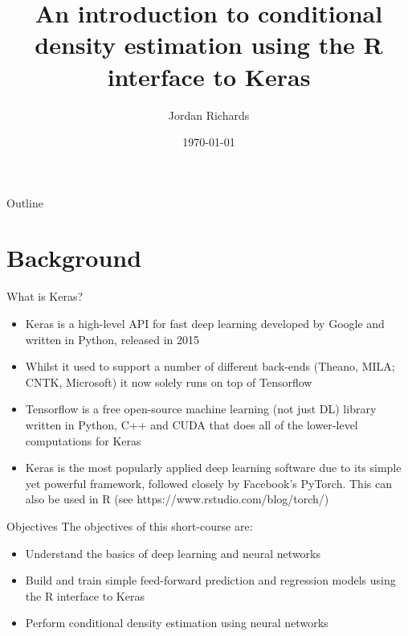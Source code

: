 \documentclass{beamer}
\title[cde-Rkeras-intro]{An introduction to conditional density estimation using the R interface to Keras
}
\author[Jordan Richards]{Jordan Richards}
\institute[KAUST]{King Abdullah University of Science and Technology (KAUST)}
\date{\today}
\begin{document}
\maketitle
\begin{frame}{Outline}
\tableofcontents
\end{frame}
\section{Background}
\begin{frame}{What is Keras?}
\begin{itemize}
\item Keras is a high-level API for fast deep learning developed by Google and written in Python, released in 2015
\item Whilst it used to support a number of different back-ends (Theano, MILA; CNTK, Microsoft) it now solely runs on top of Tensorflow
\item Tensorflow is a free open-source machine learning (not just DL) library written in Python, C++ and CUDA that does all of the lower-level computations for Keras
\item Keras is the most popularly applied deep learning software due to its simple yet powerful framework, followed closely by Facebook's PyTorch. This can also be used in R (see https://www.rstudio.com/blog/torch/)
\end{itemize}

\end{frame}

\begin{frame}{Objectives}
The objectives of this short-course are:
\begin{itemize}
\item Understand the basics of deep learning and neural networks
\item Build and train simple feed-forward prediction and regression models using the R interface to Keras
\item Perform conditional density estimation using neural networks
\end{itemize}
\end{frame}
\end{document}
